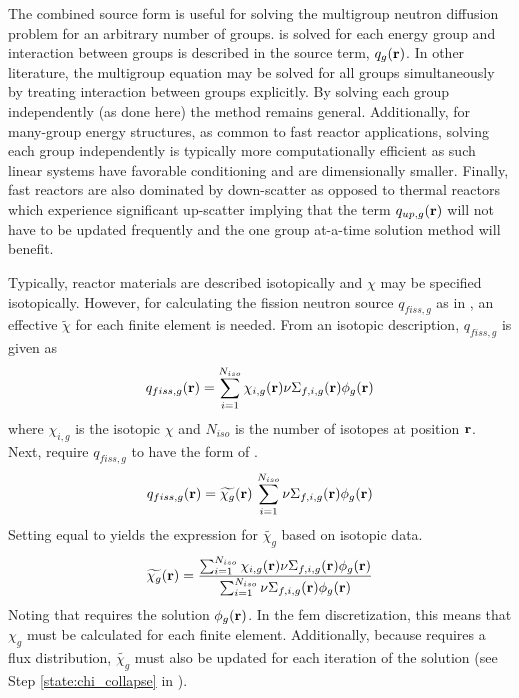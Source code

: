   The combined source form is useful for solving the multigroup neutron
  diffusion problem for an arbitrary number of groups.
   is solved for each energy group and interaction
  between groups is described in the source term, $q_g(\mathbf{r})$. In other
  literature, the multigroup equation may be solved for all groups
  simultaneously by treating interaction between groups explicitly. By solving
  each group independently (as done here) the method remains general.
  Additionally, for many-group energy structures, as common to fast reactor
  applications, solving each group independently is typically more
  computationally efficient as such linear systems have favorable conditioning
  and are dimensionally smaller. Finally, fast reactors are also dominated by
  down-scatter as opposed to thermal reactors which experience significant
  up-scatter implying that the term $q_{up,g}(\mathbf{r})$ will not have to be updated
  frequently and the one group at-a-time solution method will benefit.

  Typically, reactor materials are described isotopically and $\chi$ may be
  specified isotopically. However, for calculating the fission neutron source
  $q_{fiss,g}$ as in , an effective $\widetilde{\chi}$ for each
  finite element is needed. From an isotopic description, $q_{fiss,g}$ is given
  as
  \begin{equation}
    \label{eq:isotopic_chi}
    q_{fiss,g}(\mathbf{r}) = \sum_{i=1}^{N_{iso}} \chi_{i,g}(\mathbf{r})
      \nu \Sigma_{f,i,g}(\mathbf{r}) \phi_g(\mathbf{r})
  \end{equation}
  where $\chi_{i,g}$ is the isotopic $\chi$ and $N_{iso}$ is the 
  number of isotopes at position $\mathbf{r}$. Next, require $q_{fiss,g}$ to have the 
  form of .
  \begin{equation}
    \label{eq:element_chi}
    q_{fiss,g}(\mathbf{r}) = \widetilde{\chi_g}(\mathbf{r}) \, 
      \sum_{i=1}^{N_{iso}} \nu \Sigma_{f,i,g}(\mathbf{r}) \phi_g(\mathbf{r})
  \end{equation}
  Setting  equal to  yields the
  expression for $\widetilde{\chi_g}$ based on isotopic data.
  \begin{equation}
    \label{eq:chi_collapse}
    \widetilde{\chi_g}(\mathbf{r}) = \frac{\sum_{i=1}^{N_{iso}} \chi_{i,g}(\mathbf{r})
      \nu \Sigma_{f,i,g}(\mathbf{r}) \phi_g(\mathbf{r})}
      {\sum_{i=1}^{N_{iso}} \nu \Sigma_{f,i,g}(\mathbf{r}) \phi_g(\mathbf{r})}
  \end{equation}
  Noting that  requires the solution $\phi_g(\mathbf{r})$. In the
  \gls{fem} discretization, this means that $\chi_g$ must be calculated for each 
  finite element. Additionally, because  requires a flux
  distribution, $\widetilde{\chi_g}$ must also be updated for each iteration of
  the solution (see Step \ref{state:chi_collapse} in
  ).


